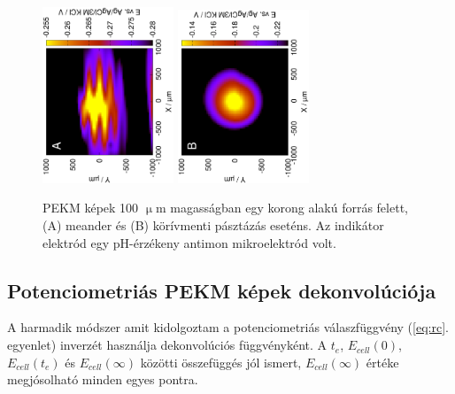 \begin{figure}
\centering
\includegraphics[trim = 10mm 30mm 0mm 10mm, clip, width=0.35\textwidth, angle=-90]{img/polar/meander.eps} \includegraphics[trim = 10mm 30mm 0mm 10mm, clip, width=0.35\textwidth, angle=-90]{img/polar/arc.eps}
\caption{PEKM képek 100 $\upmu$m magasságban egy korong alakú forrás felett, (A) meander és (B) körívmenti pásztázás eseténs.
Az indikátor elektród egy pH-érzékeny antimon mikroelektród volt.}
\label{fig:simulations}
\end{figure}

\subsection{Potenciometriás PEKM képek dekonvolúciója}
A harmadik módszer amit kidolgoztam a potenciometriás válaszfüggvény (\ref{eq:rc}. egyenlet) inverzét használja dekonvolúciós függvényként.
A $t_e$, $E_{cell}(0)$, $E_{cell}(t_e)$ és $E_{cell}(\infty)$ közötti összefüggés jól ismert, $E_{cell}(\infty)$ értéke megjósolható minden egyes pontra.

